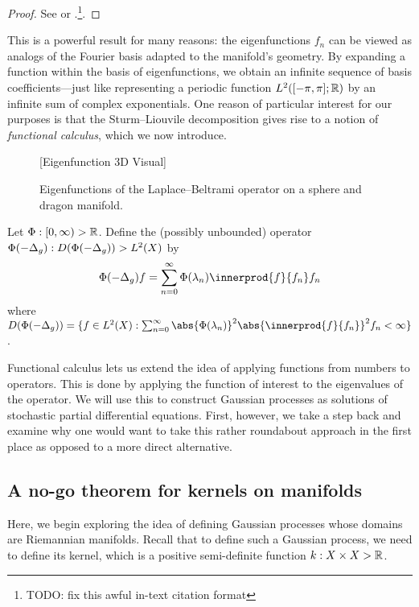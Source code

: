\documentclass[11pt]{book}
\begin{document}
\begin{proof}
See \textcite[page 139]{chavel84} or \textcite[Theorem 44]{canzani13}.\footnote{TODO: fix this awful in-text citation format}.
\end{proof}

This is a powerful result for many reasons: the eigenfunctions $f_n$ can be viewed as analogs of the Fourier basis adapted to the manifold's geometry.
By expanding a function within the basis of eigenfunctions, we obtain an infinite sequence of basis coefficients---just like representing a periodic function $L^2([-\pi,\pi];\mathbb{R})$ by an infinite sum of complex exponentials.
One reason of particular interest for our purposes is that the Sturm--Liouvile decomposition gives rise to a notion of \emph{functional calculus}, which we now introduce.


\begin{figure}
\vspace*{10ex}
[Eigenfunction 3D Visual]
\vspace*{10ex}
\caption{Eigenfunctions of the Laplace--Beltrami operator on a sphere and dragon manifold.}
\end{figure}

\begin{definition}
Let $\Phi : [0,\infty) \-> \mathbb{R}$. 
Define the (possibly unbounded) operator $\Phi(-\Delta_g) : D(\Phi(-\Delta_g)) \-> L^2(X)$ by
\[
\Phi(-\lap_g) f = \sum_{n=0}^\infty \Phi(\lambda_n) \innerprod{f}{f_n} f_n
\]
where $D(\Phi(-\lap_g)) = \{f \in L^2(X) : \sum_{n=0}^\infty \abs{\Phi(\lambda_n)}^2 \abs{\innerprod{f}{f_n}}^2 f_n < \infty\}$.
\end{definition}

Functional calculus lets us extend the idea of applying functions from numbers to operators.
This is done by applying the function of interest to the eigenvalues of the operator.
We will use this to construct Gaussian processes as solutions of stochastic partial differential equations.
First, however, we take a step back and examine why one would want to take this rather roundabout approach in the first place as opposed to a more direct alternative.

\subsection{A no-go theorem for kernels on manifolds}

Here, we begin exploring the idea of defining Gaussian processes whose domains are Riemannian manifolds.
Recall that to define such a Gaussian process, we need to define its kernel, which is a positive semi-definite function $k : X \times X \-> \mathbb{R}$.
\end{document}
